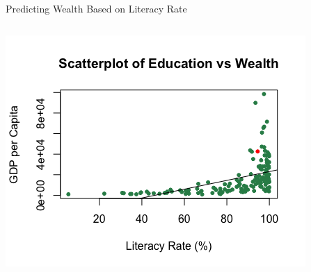 \documentclass[xcolor=dvipsnames,aspectratio=169,t]{beamer}
\begin{document}
\begin{frame}{Predicting Wealth Based on Literacy Rate}
\begin{columns}[T]
  \vspace{-0.15in}

  \begin{center}
  \includegraphics[width=0.97\tw]{images/fig-edu-gdp.png}
  \end{center}

  \end{columns}
\end{frame}
\end{document}
